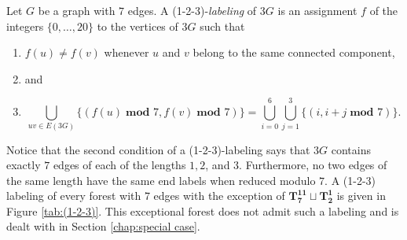 \begin{definition}\label{def:1-2-3}
    Let $G$ be a graph with $7$ edges. A (1-2-3)-\emph{labeling} of $3G$ is an assignment $f$ of the integers $\{0,\dots,20\}$ to the vertices of $3G$ such that
    \begin{enumerate}
        \item $f(u) \neq f(v)$ whenever $u$ and $v$ belong to the same connected component,
        \item[] and
        \item $$\bigcup_{uv\in E(3G)} \{(f(u)\; \textbf{mod } 7,f(v)\; \textbf{mod } 7)\}= \bigcup_{i=0}^{6} \bigcup_{j=1}^{3} \{(i,i+j \; \textbf{mod } 7)\}.$$
    \end{enumerate}

\end{definition}
Notice that the second condition of a (1-2-3)-labeling says that $3G$ contains exactly $7$ edges of each of the lengths $1,2$, and $3$. Furthermore, no two edges of the same length have the same end labels when reduced modulo $7.$ A (1-2-3) labeling of every forest with $7$ edges with the exception of $\mathbf{T_{7}^{11}}\sqcup\mathbf{T_{2}^{1}}$ is given in Figure \ref{tab:(1-2-3)}. This exceptional forest does not admit such a labeling and is dealt with in Section \ref{chap:special case}.

